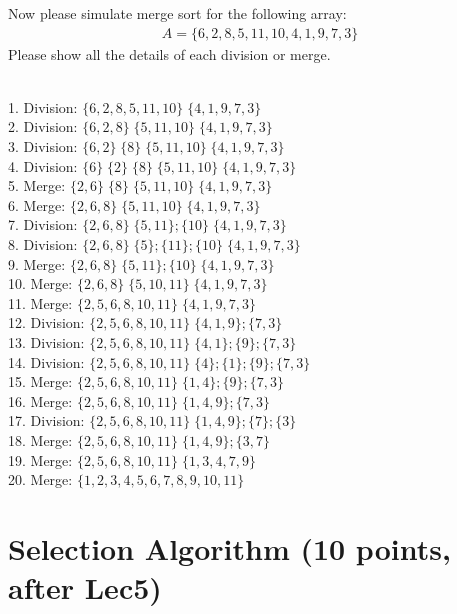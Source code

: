 \documentclass[11pt]{exam}
\begin{document}
Now please simulate merge sort for the following array:
\begin{align*}
A = \{6, 2, 8, 5, 11, 10, 4, 1, 9, 7, 3\}
\end{align*}
Please show all the details of each division or merge. 
\begin{solution}
\\
1. Division: $\{6,2,8,5,11,10\}\;\{4,1,9,7,3\}$ \\
2. Division: $\{6,2,8\}\;\{5,11,10\}\;\{4,1,9,7,3\}$ \\
3. Division: $\{6,2\}\;\{8\}\;\{5,11,10\}\;\{4,1,9,7,3\}$ \\
4. Division: $\{6\}\;\{2\}\;\{8\}\;\{5,11,10\}\;\{4,1,9,7,3\}$ \\
5. Merge: $\{2,6\}\;\{8\}\;\{5,11,10\}\;\{4,1,9,7,3\}$ \\
6. Merge: $\{2,6,8\}\;\{5,11,10\}\;\{4,1,9,7,3\}$ \\
7. Division: $\{2,6,8\}\;\{5,11\};\{10\}\;\{4,1,9,7,3\}$ \\
8. Division: $\{2,6,8\}\;\{5\};\{11\};\{10\}\;\{4,1,9,7,3\}$ \\
9. Merge: $\{2,6,8\}\;\{5,11\};\{10\}\;\{4,1,9,7,3\}$ \\
10. Merge: $\{2,6,8\}\;\{5,10,11\}\;\{4,1,9,7,3\}$ \\
11. Merge: $\{2,5,6,8,10,11\}\;\{4,1,9,7,3\}$ \\
12. Division: $\{2,5,6,8,10,11\}\;\{4,1,9\};\{7,3\}$ \\
13. Division: $\{2,5,6,8,10,11\}\;\{4,1\};\{9\};\{7,3\}$ \\
14. Division: $\{2,5,6,8,10,11\}\;\{4\};\{1\};\{9\};\{7,3\}$ \\
15. Merge: $\{2,5,6,8,10,11\}\;\{1,4\};\{9\};\{7,3\}$ \\
16. Merge: $\{2,5,6,8,10,11\}\;\{1,4,9\};\{7,3\}$ \\
17. Division: $\{2,5,6,8,10,11\}\;\{1,4,9\};\{7\};\{3\}$ \\
18. Merge: $\{2,5,6,8,10,11\}\;\{1,4,9\};\{3,7\}$ \\
19. Merge: $\{2,5,6,8,10,11\}\;\{1,3,4,7,9\}$ \\
20. Merge: $\{1,2,3,4,5,6,7,8,9,10,11\}$ \\
\end{solution}
\newpage
\section{Selection Algorithm (10 points, after Lec5)}
\end{document}
